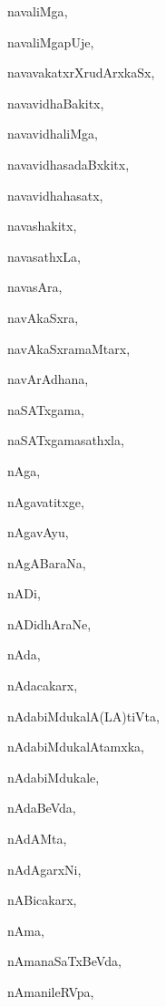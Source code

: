 \begin{multicols}{2}
{navaliMga}, \pageref{navaliMga}

{navaliMgapUje}, \pageref{navaliMgapUje}

{navavakatxrXrudArxkaSx}, \pageref{navavakatxrXrudArxkaSx}

{navavidhaBakitx}, \pageref{navavidhaBakitx}

{navavidhaliMga}, \pageref{navavidhaliMga}

{navavidhasadaBxkitx}, \pageref{navavidhasadaBxkitx}

{navavidhahasatx}, \pageref{navavidhahasatx}

{navashakitx}, \pageref{navashakitx}

{navasathxLa}, \pageref{navasathxLa}

{navasAra}, \pageref{navasAra}

{navAkaSxra}, \pageref{navAkaSxra}

{navAkaSxramaMtarx}, \pageref{navAkaSxramaMtarx}

{navArAdhana}, \pageref{navArAdhana}

{naSATxgama}, \pageref{naSATxgama}

{naSATxgamasathxla}, \pageref{naSATxgamasathxla}

{nAga}, \pageref{nAga}

{nAgavatitxge}, \pageref{nAgavatitxge}

{nAgavAyu}, \pageref{nAgavAyu}

{nAgABaraNa}, \pageref{nAgABaraNa}

{nADi}, \pageref{nADi}

{nADidhAraNe}, \pageref{nADidhAraNe}

{nAda}, \pageref{nAda}

{nAdacakarx}, \pageref{nAdacakarx}

{nAdabiMdukalA(LA)tiVta}, \pageref{nAdabiMdukalALAtiVta}

{nAdabiMdukalAtamxka}, \pageref{nAdabiMdukalAtamxka}

{nAdabiMdukale}, \pageref{nAdabiMdukale}

{nAdaBeVda}, \pageref{nAdaBeVda}

{nAdAMta}, \pageref{nAdAMta}

{nAdAgarxNi}, \pageref{nAdAgarxNi}

{nABicakarx}, \pageref{nABicakarx}

{nAma}, \pageref{nAma}

{nAmanaSaTxBeVda}, \pageref{nAmanaSaTxBeVda}

{nAmanileRVpa}, \pageref{nAmanileRVpa}


\end{multicols}
